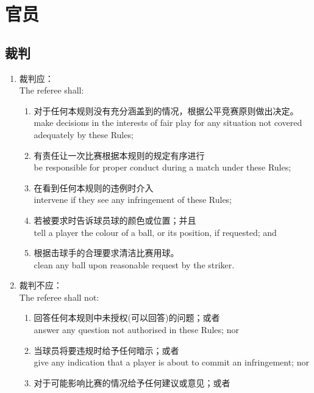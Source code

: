 \section{官员}\label{225}

\subsection{裁判}\label{2251}

\begin{enumerate}[label=(\alph*)]
    \item \label{2251a}裁判应：\\
    The referee shall:
    \begin{enumerate}[label=(\roman*)]
        \item \label{2251ai}对于任何本规则没有充分涵盖到的情况，根据公平竞赛原则做出决定。\\
        make decisions in the interests of fair play for any situation not covered adequately by these Rules;
        \item 有责任让一次比赛根据本规则的规定有序进行\\
        be responsible for proper conduct during a match under these Rules;
        \item 在看到任何本规则的违例时介入\\
        intervene if they see any infringement of these Rules;
        \item 若被要求时告诉球员球的颜色或位置；并且\\
        tell a player the colour of a ball, or its position, if requested; and
        \item 根据击球手的合理要求清洁比赛用球。\\
        clean any ball upon reasonable request by the striker.
    \end{enumerate}
    \item 裁判不应：\\
    The referee shall not:
    \begin{enumerate}[label=(\roman*)]
        \item 回答任何本规则中未授权(可以回答)的问题；或者\\
        answer any question not authorised in these Rules; nor
        \item 当球员将要违规时给予任何暗示；或者\\
        give any indication that a player is about to commit an infringement; nor
        \item 对于可能影响比赛的情况给予任何建议或意见；或者\\

\end{enumerate}
\end{enumerate}
